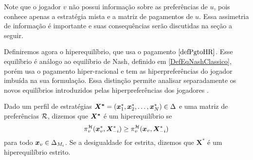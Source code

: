 Note que o jogador $v$ não possui informação sobre as preferências de $u$, pois conhece apenas a estratégia mista e a matriz de pagamentos de $u$. Essa assimetria de informação é importante e suas consequências serão discutidas na seção a seguir. 

Definiremos agora o hiperequilíbrio, que usa o pagamento $\eqref{defPgtoHR}$. Esse equilíbrio é análogo ao equilíbrio de Nash, definido em \ref{DefEqNashClassico}, porém usa o pagamento hiper-racional e tem as hiperpreferências do jogador imbuída na sua formulação. Essa distinção permite analisar separadamente os novos equilíbrios introduzidos pelas hiperpreferências dos jogadores \cite{askari2019behavioral}.

\begin{definition}
    \label{defHiperEq}
    Dado um perfil de estratégias $\boldsymbol{X^*}=(\boldsymbol{x}^*_{1},\boldsymbol{x}^*_{2},\dots,\boldsymbol{x}^*_{N})\in\Delta$ e uma matriz de preferências $\mathcal{R}$, dizemos que $\boldsymbol{X^*}$ é um hiperequilíbrio se
    \begin{equation*}
        \pi^{\mathcal{H}}_v(\boldsymbol{x}^*_v,\boldsymbol{X}^*_{-i})\geq \pi^{\mathcal{H}}_v(\boldsymbol{x}_v,\boldsymbol{X}^*_{-i})
    \end{equation*}
    para todo $\boldsymbol{x}_v\in\Delta_{M_i}$. Se a desigualdade for estrita, dizemos que $\boldsymbol{X^*}$ é um hiperequilíbrio estrito.
\end{definition}


